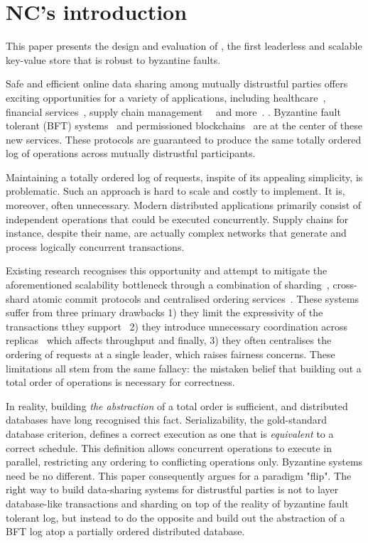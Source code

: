 \section{NC's introduction}

This paper presents the design and evaluation of \sys{}, the
first leaderless and scalable key-value store that is robust
to byzantine faults.

Safe and efficient online data sharing among mutually distrustful
parties offers exciting opportunities for a variety of applications,
including healthcare~\cite{}, financial services~\cite{}, supply chain
management~~\cite{} and more~\cite{}. . Byzantine fault tolerant (BFT)
systems~\cite{} and permissioned blockchains~\cite{}
are at the center of these new services. These protocols are guaranteed to
produce the same totally ordered log of operations across mutually distrustful
participants. 

Maintaining a totally ordered log of requests, inspite of its appealing simplicity, is problematic. Such an approach is hard to scale and costly to implement. It is, moreover, often unnecessary. Modern distributed applications primarily consist of independent operations that could be executed concurrently. Supply chains for instance, despite their name, are actually complex networks that generate and process logically concurrent transactions.

Existing research recognises this opportunity and attempt to mitigate the aforementioned scalability bottleneck through a combination of sharding~\cite{omniledger,chainspace,callinicos}, cross-shard atomic commit protocols and centralised ordering services~\cite{}. These systems suffer from three primary drawbacks 1) they limit the expressivity of the transactions tthey support~\cite{} 2) they introduce unnecessary coordination across replicas~\cite{} which affects throughput and finally, 3) they often centralises the ordering of requests at a single leader, which raises fairness concerns. These limitations all stem from the same fallacy: the mistaken belief that building out a total order of operations is necessary for correctness.
 
In reality, building \textit{the abstraction} of a total order is sufficient, and distributed databases have long recognised this fact. Serializability, the gold-standard database criterion, defines a correct execution as one that is \textit{equivalent} to a correct schedule. This definition allows concurrent operations to execute in parallel, restricting any ordering to conflicting operations only.  Byzantine systems need be no different. This paper consequently argues for a paradigm "flip". The right way to build data-sharing systems for distrustful parties is not to layer database-like transactions and sharding on top of the reality of byzantine fault tolerant log, but instead to do the opposite and build out the abstraction of a BFT log atop a partially ordered distributed database.

